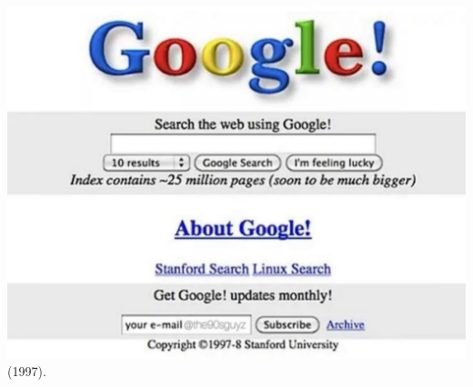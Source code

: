 	\begin{center}
		\includegraphics[height=.75\textheight]{./IMG/google-1997.jpg}\\ (1997).
	\end{center}

\vfil\null
\pagebreak

